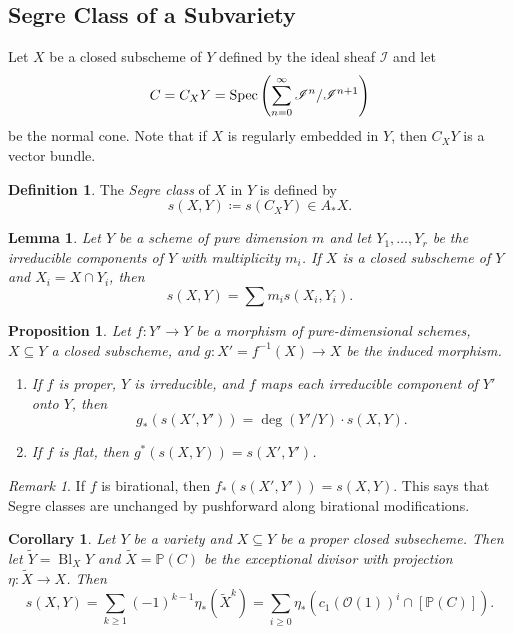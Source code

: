 \documentclass[leqno, openany]{memoir}
\newtheorem{cor}[thm]{Corollary}
\newtheorem{prop}[thm]{Proposition}
\newtheorem{lem}[thm]{Lemma}
\theoremstyle{definition}
\newtheorem{defn}[thm]{Definition}
\theoremstyle{remark}
\newtheorem{rmk}[thm]{Remark}
\theoremstyle{plain}
\theoremstyle{definition}
\theoremstyle{remark}
\renewcommand{\P}{\mathbb{P}}
\newcommand{\msc}[1]{\mathscr{#1}}
\newcommand{\wt}[1]{\widetilde{#1}}
\DeclareMathOperator{\Spec}{Spec}
\begin{document}
\subsection{Segre Class of a Subvariety}%
\label{sub:segre_class_of_a_subvariety}

Let $X$ be a closed subscheme of $Y$ defined by the ideal sheaf $\msc{I}$ and let
\[ C = C_X Y = \Spec \qty( \sum_{n=0}^{\infty} \msc{I}^n / \msc{I}^{n+1} ) \]
be the normal cone. Note that if $X$ is regularly embedded in $Y$, then $C_X Y$ is a vector bundle.

\begin{defn}
    The \textit{Segre class} of $X$ in $Y$ is defined by
    \[ s(X,Y) \coloneqq s(C_X Y) \in A_* X. \]
\end{defn}

\begin{lem}
    Let $Y$ be a scheme of pure dimension $m$ and let $Y_1, \ldots, Y_r$ be the irreducible components of $Y$ with multiplicity $m_i$. If $X$ is a closed subscheme of $Y$ and $X_i = X \cap Y_i$, then
    \[ s(X,Y) = \sum m_i s(X_i, Y_i). \]
\end{lem}

\begin{prop}
    Let $f \colon Y' \to Y$ be a morphism of pure-dimensional schemes, $X \subseteq Y$ a closed subscheme, and $g \colon X' = f^{-1}(X) \to X$ be the induced morphism.
    \begin{enumerate}
        \item If $f$ is proper, $Y$ is irreducible, and $f$ maps each irreducible component of $Y'$ onto $Y$, then
            \[ g_* (s(X', Y')) = \deg (Y'/Y) \cdot s(X,Y). \]
        \item If $f$ is flat, then $g^*(s(X,Y)) = s(X',Y')$.
    \end{enumerate}
\end{prop}

\begin{rmk}
    If $f$ is birational, then $f_* (s(X', Y')) = s(X,Y)$. This says that Segre classes are unchanged by pushforward along birational modifications.
\end{rmk}

\begin{cor}
    Let $Y$ be a variety and $X \subseteq Y$ be a proper closed subsecheme. Then let $\wt{Y} = \operatorname{Bl}_X Y$ and $\wt{X} = \P(C)$ be the exceptional divisor with projection $\eta \colon \wt{X} \to X$. Then
    \[ s(X,Y) = \sum_{k \geq 1} {(-1)}^{k-1} \eta_* (\wt{X}^k) = \sum_{i \geq 0} \eta_* ({c_1(\msc{O}(1))}^i \cap [\P(C)]). \]
\end{cor}
\end{document}
